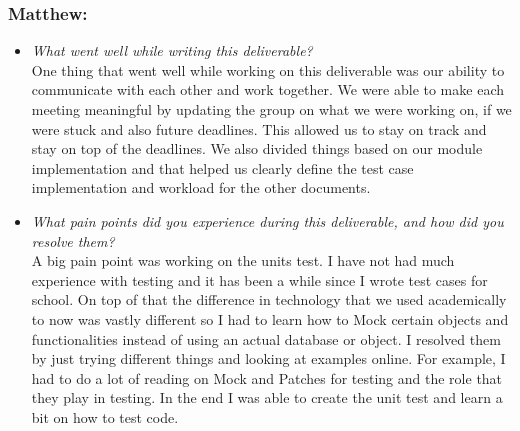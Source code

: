 \documentclass[12pt, titlepage]{article}
\begin{document}
\subsubsection*{Matthew:}
\begin{itemize}
  \item \textit{What went well while writing this deliverable?} \\

    One thing that went well while working on this deliverable was our ability to communicate with each other and work together. We were able to make each meeting meaningful by updating the group on what we were working on, if we were stuck and also future deadlines. This allowed us to stay on track and stay on top of the deadlines. We also divided things based on our module implementation and that helped us clearly define the test case implementation and workload for the other documents.

  \item \textit{What pain points did you experience during this deliverable, and how did you resolve them?}\\

    A big pain point was working on the units test. I have not had much experience with testing and it has been a while since I wrote test cases for school. On top of that the difference in technology that we used academically to now was vastly different so I had to learn how to Mock certain objects and functionalities instead of using an actual database or object. I resolved them by just trying different things and looking at examples online. For example, I had to do a lot of reading on Mock and Patches for testing and the role that they play in testing. In the end I was able to create the unit test and learn a bit on how to test code.

\end{itemize}
\end{document}
